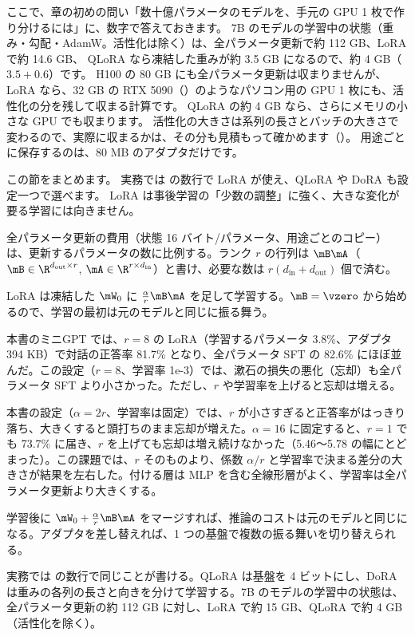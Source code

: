 ここで、章の初めの問い「数十億パラメータのモデルを、手元の GPU 1 枚で作り分けるには」に、数字で答えておきます。
7B のモデルの学習中の状態（重み・勾配・AdamW。活性化は除く）は、全パラメータ更新で約 112 GB、LoRA で約 14.6 GB、
QLoRA なら凍結した重みが約 3.5 GB になるので、約 4 GB（$3.5+0.6$）です。
H100 の 80 GB にも全パラメータ更新は収まりませんが、LoRA なら、32 GB の RTX 5090（）のようなパソコン用の GPU 1 枚にも、活性化の分を残して収まる計算です。
QLoRA の約 4 GB なら、さらにメモリの小さな GPU でも収まります。
活性化の大きさは系列の長さとバッチの大きさで変わるので、実際に収まるかは、その分も見積もって確かめます（）。
用途ごとに保存するのは、80 MB のアダプタだけです。

この節をまとめます。
実務では  の数行で LoRA が使え、QLoRA や DoRA も設定一つで選べます。
LoRA は事後学習の「少数の調整」に強く、大きな変化が要る学習には向きません。

\begin{summary}
\item 全パラメータ更新の費用（状態 16 バイト/パラメータ、用途ごとのコピー）は、更新するパラメータの数に比例する。ランク $r$ の行列は $\mB\mA$（$\mB\in\R^{d_{\text{out}}\times r}$, $\mA\in\R^{r\times d_{\text{in}}}$）と書け、必要な数は $r(d_{\text{in}}+d_{\text{out}})$ 個で済む。
\item LoRA は凍結した $\mW_0$ に $\frac{\alpha}{r}\mB\mA$ を足して学習する。$\mB=\vzero$ から始めるので、学習の最初は元のモデルと同じに振る舞う。
\item 本書のミニGPT では、$r=8$ の LoRA（学習するパラメータ 3.8\%、アダプタ 394 KB）で対話の正答率 81.7\% となり、全パラメータ SFT の 82.6\% にほぼ並んだ。この設定（$r=8$、学習率 1e-3）では、漱石の損失の悪化（忘却）も全パラメータ SFT より小さかった。ただし、$r$ や学習率を上げると忘却は増える。
\item 本書の設定（$\alpha=2r$、学習率は固定）では、$r$ が小さすぎると正答率がはっきり落ち、大きくすると頭打ちのまま忘却が増えた。$\alpha=16$ に固定すると、$r=1$ でも 73.7\% に届き、$r$ を上げても忘却は増え続けなかった（5.46〜5.78 の幅にとどまった）。この課題では、$r$ そのものより、係数 $\alpha/r$ と学習率で決まる差分の大きさが結果を左右した。付ける層は MLP を含む全線形層がよく、学習率は全パラメータ更新より大きくする。
\item 学習後に $\mW_0+\frac{\alpha}{r}\mB\mA$ をマージすれば、推論のコストは元のモデルと同じになる。アダプタを差し替えれば、1 つの基盤で複数の振る舞いを切り替えられる。
\item 実務では  の数行で同じことが書ける。QLoRA は基盤を 4 ビットにし、DoRA は重みの各列の長さと向きを分けて学習する。7B のモデルの学習中の状態は、全パラメータ更新の約 112 GB に対し、LoRA で約 15 GB、QLoRA で約 4 GB（活性化を除く）。
\end{summary}

